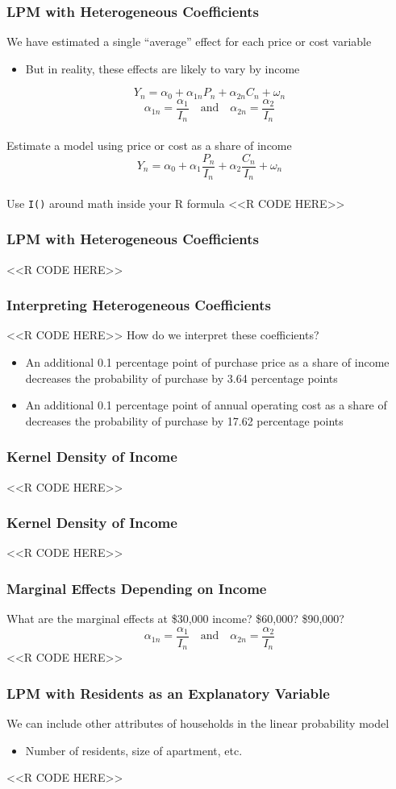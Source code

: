 \documentclass{beamer}
\begin{document}
\begin{frame}[fragile]\frametitle{LPM with Heterogeneous Coefficients}
    We have estimated a single ``average'' effect for each price or cost variable
    \begin{itemize}
        \item But in reality, these effects are likely to vary by income
    \end{itemize}
    $$Y_n = \alpha_0 + \alpha_{1n} P_n + \alpha_{2n} C_n + \omega_n$$
    $$\alpha_{1n} = \frac{\alpha_1}{I_n} \quad \text{and} \quad \alpha_{2n} = \frac{\alpha_2}{I_n}$$ \\
    \vspace{2ex}
    Estimate a model using price or cost as a share of income
    $$Y_n = \alpha_0 + \alpha_1 \frac{P_n}{I_n} + \alpha_2 \frac{C_n}{I_n} + \omega_n$$ \\
    \vspace{2ex}
    Use \texttt{I()} around math inside your R formula
    <<R CODE HERE>>
\end{frame}

\begin{frame}[fragile]\frametitle{LPM with Heterogeneous Coefficients}
    <<R CODE HERE>>
\end{frame}

\begin{frame}[fragile]\frametitle{Interpreting Heterogeneous Coefficients}
    <<R CODE HERE>>
    \vspace{2ex}
    How do we interpret these coefficients?
    \begin{itemize}
        \item An additional 0.1 percentage point of purchase price as a share of income decreases the probability of purchase by 3.64 percentage points
        \item An additional 0.1 percentage point of annual operating cost as a share of decreases the probability of purchase by 17.62 percentage points
    \end{itemize}
\end{frame}

\begin{frame}[fragile]\frametitle{Kernel Density of Income}
    <<R CODE HERE>>
\end{frame}

\begin{frame}[fragile]\frametitle{Kernel Density of Income}
    <<R CODE HERE>>
\end{frame}

\begin{frame}[fragile]\frametitle{Marginal Effects Depending on Income}
    What are the marginal effects at \$30,000 income? \$60,000? \$90,000?
    $$\alpha_{1n} = \frac{\alpha_1}{I_n} \quad \text{and} \quad \alpha_{2n} = \frac{\alpha_2}{I_n}$$
    <<R CODE HERE>>
\end{frame}

\begin{frame}[fragile]\frametitle{LPM with Residents as an Explanatory Variable}
    We can include other attributes of households in the linear probability model
    \begin{itemize}
        \item Number of residents, size of apartment, etc.
    \end{itemize}
    <<R CODE HERE>>
\end{frame}
\end{document}
